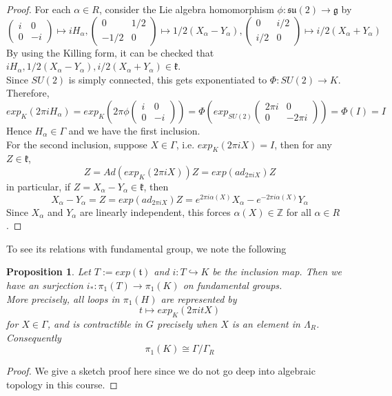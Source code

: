 \documentclass[11pt]{article}
\newtheorem{proposition}[theorem]{Proposition}
\newcommand{\bb}[1]{\mathbb{#1}}
\newcommand{\mf}[1]{\mathfrak{#1}}
\begin{document}
\begin{proof}
For each $\alpha \in R$, consider the Lie algebra homomorphism $\phi: \mf{su}(2) \to \mf{g}$ by
$$\left( \begin{array}{cc}
i & 0  \\
0 & -i  \end{array} \right) \mapsto i H_{\alpha}, \left( \begin{array}{cc}
0 & 1/2  \\
-1/2 & 0  \end{array} \right) \mapsto 1/2(X_{\alpha} - Y_{\alpha}),  \left( \begin{array}{cc}
0 & i/2  \\
i/2 & 0  \end{array} \right) \mapsto i/2(X_{\alpha} + Y_{\alpha})$$
By using the Killing form, it can be checked that $i H_{\alpha}, 1/2(X_{\alpha} - Y_{\alpha}), i/2(X_{\alpha} + Y_{\alpha}) \in \mf{k}$.\\
Since $SU(2)$ is simply connected, this gets exponentiated to $\Phi: SU(2) \to K$. Therefore,
$$exp_K (2\pi iH_{\alpha}) = exp_K (2\pi \phi \left( \begin{array}{cc}
i & 0  \\
0 & -i  \end{array} \right)) = \Phi (exp_{SU(2)} \left( \begin{array}{cc}
2\pi i & 0  \\
0 & -2\pi i  \end{array} \right)) = \Phi(I) = I$$
Hence $H_{\alpha} \in \Gamma$ and we have the first inclusion.\\

For the second inclusion, suppose $X \in \Gamma$, i.e. $exp_K(2\pi iX) = I$, then for any $Z \in \mf{k}$,
$$Z = Ad(exp_K(2\pi i X))Z = exp(ad_{2\pi i X})Z$$
in particular, if $Z = X_{\alpha} - Y_{\alpha} \in \mf{k}$, then
$$X_{\alpha} - Y_{\alpha} = Z = exp(ad_{2\pi i X})Z = e^{2\pi i \alpha(X)}X_{\alpha} - e^{-2\pi i \alpha(X)}Y_{\alpha}$$
Since $X_{\alpha}$ and $Y_{\alpha}$ are linearly independent, this forces $\alpha(X) \in \bb{Z}$ for all $\alpha \in R$.
\end{proof}

To see its relations with fundamental group, we note the following
\begin{proposition}
Let $T := exp(\mf{t})$ and $i: T \hookrightarrow K$ be the inclusion map. Then we have an surjection $i_*: \pi_1(T) \to \pi_1(K)$ on fundamental groups. \\
More precisely, all loops in $\pi_1(H)$ are represented by
$$t \mapsto exp_K(2\pi it X)$$
for $X \in \Gamma$, and is contractible in $G$ precisely when $X$ is an element in $\Lambda_R$. Consequently
$$\pi_1(K) \cong \Gamma/\Gamma_R$$
\end{proposition}
\begin{proof}
We give a sketch proof here since we do not go deep into algebraic topology in this course.
\end{proof}
\end{document}
